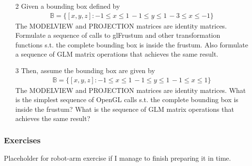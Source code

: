 \documentclass[11pt]{beamer}
\begin{document}
	\begin{frame}
	\begin{enumerate}
\item[2] Given a bounding box defined by
	\begin{align*}
	\mathbb{B}=\{[x,y,z]:-1\leq x\leq 1\, -1\leq y\leq 1\, -3\leq x\leq -1\}
	\end{align*}
The MODELVIEW and PROJECTION matrices are identity matrices.
Formulate a sequence of calls to glFrustum and other transformation functions s.t. the
complete bounding box is inside the frustum. Also formulate a sequence of GLM matrix
operations that achieves the same result.	
	
	\item[3] Then, assume the bounding box are given by
	\begin{align*}
	\mathbb{B}=\{[x,y,z]:-1\leq x\leq 1\, -1\leq y\leq 1\, -1\leq x\leq 1\}
	\end{align*}	
	 The MODELVIEW and PROJECTION matrices are identity matrices.
What is the simplest sequence of OpenGL calls s.t. the complete bounding box is inside the
frustum? What is the sequence of GLM matrix operations that achieves the same result?

	\end{enumerate}
	\end{frame}
	
	\begin{frame}
	\frametitle{Exercises}
	Placeholder for robot-arm exercise if I manage to finish preparing it in time.
	\end{frame}
\end{document}
